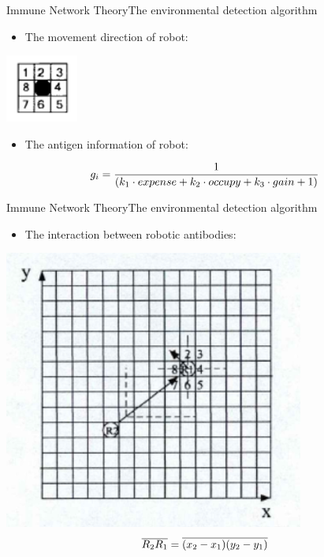 \begin{frame}{Immune Network Theory}{The environmental detection algorithm}
  \begin{itemize}
  \item \large{
    The movement direction of robot:
  }
  \end{itemize}
  \par
  \centering
    \includegraphics[scale=0.8] {img/movement_direction.png}
  \par
  \begin{itemize}
  \item \large{
    The antigen information of robot:
  }
  \end{itemize}
  \begin{equation} \large{
     g_{i}=\frac{1}{(k_{1}\cdot expense+k_{2}\cdot occupy+k_{3}\cdot gain+1)}}
  \end{equation}
\end{frame}

\begin{frame}{Immune Network Theory}{The environmental detection algorithm}
  \begin{itemize}
  \item \large{
    The interaction between robotic antibodies:
  }
  \end{itemize}
  \par
  \centering
    \includegraphics[scale=0.6] {img/immune_network_force_diagram.png}
  \begin{equation} \large{
     \overline{R_{2}R_{1}}=\overline{(x_{2}-x_{1})(y_{2}-y_{1})}}
  \end{equation}
\end{frame}

